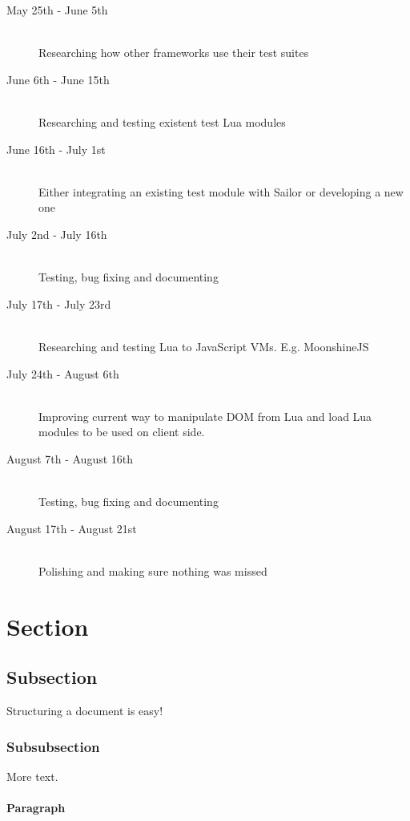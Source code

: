 \documentclass{article}
\begin{document}
		\begin{description}
	  \item[May 25th - June 5th] \hfill \\
	  Researching how other frameworks use their test suites
	  \item[June 6th - June 15th] \hfill \\
	  Researching and testing existent test Lua modules
	  \item[June 16th - July 1st] \hfill \\
	  Either integrating an existing test module with Sailor or developing a new one
	  \item[July 2nd - July 16th] \hfill \\
	  Testing, bug fixing and documenting
			\item[July 17th - July 23rd] \hfill \\
	  Researching and testing Lua to JavaScript VMs. E.g. MoonshineJS
			\item[July 24th - August 6th] \hfill \\
	  Improving current way to manipulate DOM from Lua and load Lua modules to be used on client side.
			\item[August 7th - August 16th] \hfill \\
	  Testing, bug fixing and documenting
			\item[August 17th - August 21st] \hfill \\
	  Polishing and making sure nothing was missed
		\end{description}
		
	\section{Section}
		\subsection{Subsection}

			Structuring a document is easy! \autocite[97]{johnsbook}

		\subsubsection{Subsubsection}

			More text. \autocite{VELLAGE:1}

			\paragraph{Paragraph}
\end{document}
